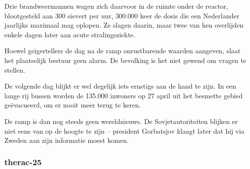 Drie brandweermannen wagen zich daarvoor in de ruimte onder de reactor, blootgesteld aan 300 sievert per uur, 300.000 keer de dosis die een Nederlander jaarlijks maximaal mag oplopen. Ze slagen daarin, maar twee van hen overlijden enkele dagen later aan acute stralingsziekte.

Hoewel geigertellers de dag na de ramp onrustbarende waarden aangeven, slaat het plaatselijk bestuur geen alarm. De bevolking is het niet gewend om vragen te stellen.

De volgende dag blijkt er wel degelijk iets ernstigs aan de hand te zijn. In een lange rij bussen worden de 135.000 inwoners op 27 april uit het besmette gebied geëvacueerd, om er nooit meer terug te keren.

De ramp is dan nog steeds geen wereldnieuws. De Sovjetautoriteiten blijken er niet eens van op de hoogte te zijn – president Gorbatsjov klaagt later dat hij via Zweden aan zijn informatie moest komen.



\cite{verschuur14012013tjernobylreports}

\cite{paperlessarchivesTjernobyl}

\cite{vargos082000tjernobylconcerns}

\cite{mauroNuclearRiskSociety}

\cite{vienna06092005LookingBack}

\subsubsection{therac-25}

